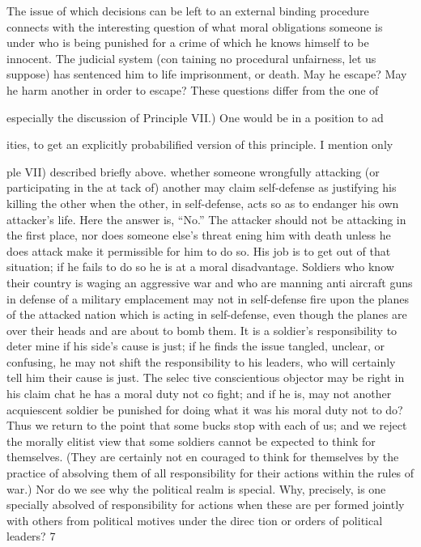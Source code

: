 \documentclass[11pt,openany]{book}
\begin{document}
The issue of which decisions can be left to an external binding procedure connects with the interesting question of what moral obligations someone is under who is being punished for a crime of which he knows himself to be innocent. The judicial system (con taining no procedural unfairness, let us suppose) has sentenced him to life imprisonment, or death. May he escape? May he harm another in order to escape? These questions differ from the one of 

especially the discussion of Principle VII.) One would be in a position to ad

ities, to get an explicitly probabilified version of this principle. I mention only 

ple VII) described briefly above. whether someone wrongfully attacking (or participating in the at tack of) another may claim self-defense as justifying his killing the other when the other, in self-defense, acts so as to endanger his own attacker's life. Here the answer is, ``No.'' The attacker should not be attacking in the first place, nor does someone else's threat ening him with death unless he does attack make it permissible for him to do so. His job is to get out of that situation; if he fails to do so he is at a moral disadvantage. Soldiers who know their country is waging an aggressive war and who are manning anti aircraft guns in defense of a military emplacement may not in self-defense fire upon the planes of the attacked nation which is acting in self-defense, even though the planes are over their heads and are about to bomb them. It is a soldier's responsibility to deter mine if his side's cause is just; if he finds the issue tangled, unclear, or confusing, he may not shift the responsibility to his leaders, who will certainly tell him their cause is just. The selec tive conscientious objector may be right in his claim chat he has a moral duty not co fight; and if he is, may not another acquiescent soldier be punished for doing what it was his moral duty not to do? Thus we return to the point that some bucks stop with each of us; and we reject the morally elitist view that some soldiers cannot be expected to think for themselves. (They are certainly not en couraged to think for themselves by the practice of absolving them of all responsibility for their actions within the rules of war.) Nor do we see why the political realm is special. Why, precisely, is one specially absolved of responsibility for actions when these are per formed jointly with others from political motives under the direc tion or orders of political leaders? 7 
\end{document}
